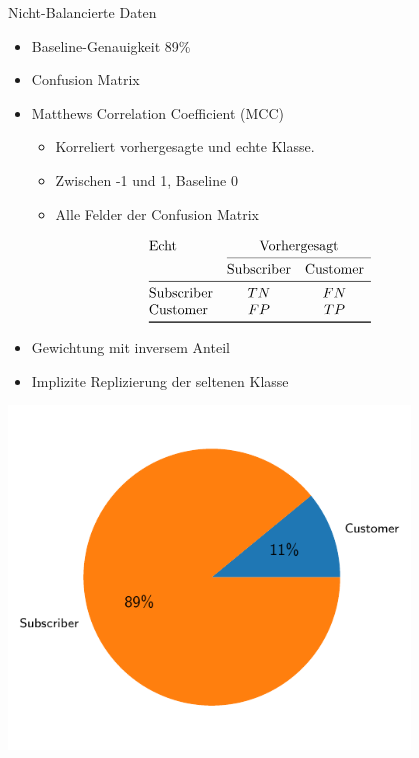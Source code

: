 \begin{frame}{Nicht-Balancierte Daten}
{
\begin{itemize}
\item Baseline-Genauigkeit 89\%
\item Confusion Matrix
\item Matthews Correlation Coefficient (MCC)
\begin{itemize}
\vspace{-1\baselineskip}
\item Korreliert vorhergesagte und echte Klasse.
\item Zwischen -1 und 1, Baseline 0
\item Alle Felder der Confusion Matrix
\end{itemize}
\end{itemize}
}
{
\[
\begin{array}{@{}l*{5}{c}@{}}
\text{Echt} & \multicolumn{2}{c@{}}{\text{Vorhergesagt}}\\
    \cmidrule(l){2-3}
    & \text{Subscriber} & \text{Customer}\\
\midrule
\text{Subscriber} & TN & FN  \\
\text{Customer}   & FP & TP  \\
\bottomrule
\end{array}
\]
\vspace{0.1cm}
}

{
\begin{itemize}
\item Gewichtung mit inversem Anteil
\item Implizite Replizierung der seltenen Klasse
\end{itemize}
}
\begin{minipage}{0.4\textwidth}
\centering
\includegraphics[width=0.8\textwidth]{../Images/Piechart}
\end{minipage}
\end{frame}


